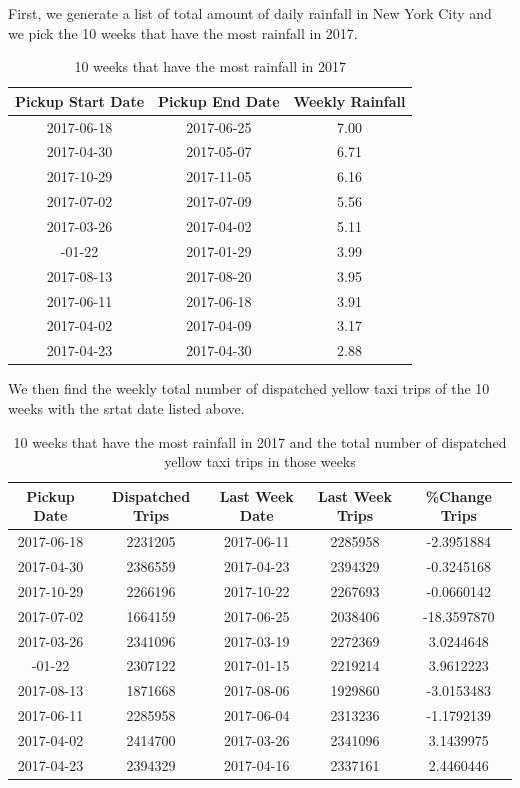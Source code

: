 \documentclass[12pt,twoside]{reedthesis}
\theoremstyle{definition}
\theoremstyle{definition}
\theoremstyle{definition}
\theoremstyle{remark}
\begin{document}
First, we generate a list of total amount of daily rainfall in New York
City and we pick the 10 weeks that have the most rainfall in 2017.
\begin{table}

\caption{\label{tab:unnamed-chunk-73}10 weeks that have the most rainfall in 2017}
\centering
\begin{tabular}[t]{ccc}
\toprule
Pickup Start Date & Pickup End Date & Weekly Rainfall\\
\midrule
2017-06-18 & 2017-06-25 & 7.00\\
2017-04-30 & 2017-05-07 & 6.71\\
2017-10-29 & 2017-11-05 & 6.16\\
2017-07-02 & 2017-07-09 & 5.56\\
2017-03-26 & 2017-04-02 & 5.11\\
\addlinespace
2017-01-22 & 2017-01-29 & 3.99\\
2017-08-13 & 2017-08-20 & 3.95\\
2017-06-11 & 2017-06-18 & 3.91\\
2017-04-02 & 2017-04-09 & 3.17\\
2017-04-23 & 2017-04-30 & 2.88\\
\bottomrule
\end{tabular}
\end{table}
We then find the weekly total number of dispatched yellow taxi trips of
the 10 weeks with the srtat date listed above.
\begin{table}

\caption{\label{tab:unnamed-chunk-75}10 weeks that have the most rainfall in 2017 and the total number of dispatched yellow taxi trips in those weeks}
\centering
\begin{tabular}[t]{ccccc}
\toprule
Pickup Date & Dispatched Trips & Last Week Date & Last Week Trips & \%Change Trips\\
\midrule
2017-06-18 & 2231205 & 2017-06-11 & 2285958 & -2.3951884\\
2017-04-30 & 2386559 & 2017-04-23 & 2394329 & -0.3245168\\
2017-10-29 & 2266196 & 2017-10-22 & 2267693 & -0.0660142\\
2017-07-02 & 1664159 & 2017-06-25 & 2038406 & -18.3597870\\
2017-03-26 & 2341096 & 2017-03-19 & 2272369 & 3.0244648\\
\addlinespace
2017-01-22 & 2307122 & 2017-01-15 & 2219214 & 3.9612223\\
2017-08-13 & 1871668 & 2017-08-06 & 1929860 & -3.0153483\\
2017-06-11 & 2285958 & 2017-06-04 & 2313236 & -1.1792139\\
2017-04-02 & 2414700 & 2017-03-26 & 2341096 & 3.1439975\\
2017-04-23 & 2394329 & 2017-04-16 & 2337161 & 2.4460446\\
\bottomrule
\end{tabular}
\end{table}
\end{document}
